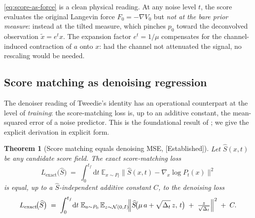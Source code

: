 \documentclass[11pt]{article}
\newtheorem{theorem}[proposition]{Theorem}
\theoremstyle{definition}
\newcommand{\E}{\mathbb{E}}
\newcommand{\Detl}{\Delta_t}
\newcommand{\Established}{\textcolor{black!50!green}{\textsf{[Established]}}}
\begin{document}
\begin{intuition}
\eqref{eq:score-as-force} is a clean physical reading. At any noise
level \(t\), the score evaluates the original Langevin force
\(F_0 = -\nabla V_0\) but \emph{not at the bare prior measure}:
instead at the tilted measure, which pinches \(p_0\) toward the
deconvolved observation \(\widetilde x = e^t x\). The expansion
factor \(e^t = 1/\mu\) compensates for the channel-induced
contraction of \(a\) onto \(x\): had the channel not attenuated the
signal, no rescaling would be needed.
\end{intuition}

\subsection{Score matching as denoising regression}\label{sec:score-matching}

The denoiser reading of Tweedie's identity has an operational
counterpart at the level of \emph{training}: the score-matching loss
\citep{Hyvarinen2005} is, up to an additive constant, the
mean-squared error of a noise predictor. This is the foundational
result of \citet{Vincent2011}; we give the explicit derivation in
explicit form.

\begin{theorem}[Score matching equals denoising MSE,
\Established]\label{thm:score-matching}
Let \(\widehat S(x, t)\) be any candidate score field. The
\emph{exact score-matching loss}
\begin{equation}\label{eq:exact-loss}
    L_{\mathrm{exact}}\!\bigl(\widehat S\bigr)
    \;=\;
    \int_{0}^{t_f}\!\mathrm d t\;
    \E_{x \sim P_t}\!\bigl\|\widehat S(x, t) - \nabla_x \log P_t(x)\bigr\|^2
\end{equation}
is equal, up to a \(\widehat S\)-independent additive constant
\(C\), to the \emph{denoising loss}
\begin{equation}\label{eq:denoising-loss}
    L_{\mathrm{exact}}\!\bigl(\widehat S\bigr)
    \;=\;
    \int_{0}^{t_f}\!\mathrm d t\;
    \E_{a \sim P_0}\,
    \E_{z \sim \mathcal N(0, I)}\!
    \Bigl\|\widehat S\!\bigl(\mu\, a + \sqrt{\Detl}\, z,\, t\bigr)
           \;+\; \tfrac{z}{\sqrt{\Detl}}\Bigr\|^2
    \;+\; C.
\end{equation}
\end{theorem}
\end{document}
